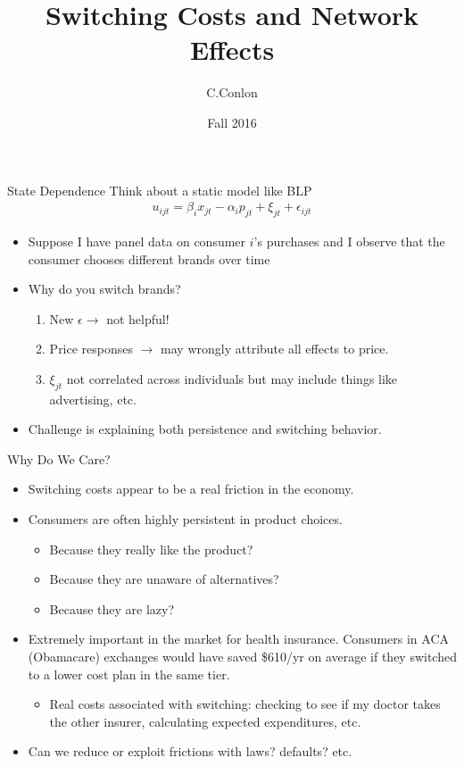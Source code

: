 \documentclass[xcolor=pdftex,dvipsnames,table,mathserif]{beamer}
\title [Dynamic Oligopoly I]{Switching Costs and Network Effects}
\author{C.Conlon }
\institute{Grad IO }
\date{Fall 2016}
\begin{document}
\begin{frame}
\titlepage
\end{frame}



\begin{frame}{State Dependence}
Think about a static model like BLP
\begin{eqnarray*}
u_{ijt} = \beta_i x_{jt} - \alpha_i p_{jt} + \xi_{jt} + \epsilon_{ijt}
\end{eqnarray*}
\begin{itemize}
\item Suppose I have panel data on consumer $i$'s purchases and I observe that the consumer chooses different brands over time
\item Why do you switch brands? 
\begin{enumerate}
\item New $\epsilon \rightarrow$ not helpful!
\item Price responses $\rightarrow$ may wrongly attribute all effects to price.
\item $\xi_{jt}$ not correlated across individuals but may include things like advertising, etc.
\end{enumerate}
\item Challenge is explaining both \alert{persistence} and \alert{switching} behavior.
\end{itemize}
\end{frame} 

\begin{frame}{Why Do We Care?}
\begin{itemize}
\item Switching costs appear to be a real friction in the economy.
\item Consumers are often highly persistent in product choices.
\begin{itemize}
\item Because they really like the product?
\item Because they are unaware of alternatives?
\item Because they are lazy?
\end{itemize}
\item Extremely important in the market for \alert{health insurance}. Consumers in ACA (Obamacare) exchanges would have saved \$610/yr on average if they switched to a lower cost plan in the same tier.
\begin{itemize}
\item Real costs associated with switching: checking to see if my doctor takes the other insurer, calculating expected expenditures, etc.
\end{itemize}
\item Can we reduce or exploit frictions with laws? defaults? etc.
\end{itemize}
\end{frame} 
\end{document}
